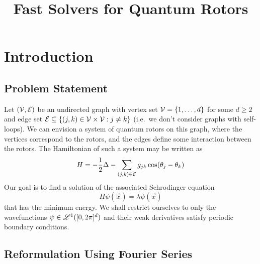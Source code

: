 \documentclass{amsart}
\title{Fast Solvers for Quantum Rotors}
\begin{document}
\maketitle

\section{Introduction}

\subsection{Problem Statement}

Let $(\mathcal{V}, \mathcal{E})$ be an undirected graph with vertex set $\mathcal{V} = \{1, \ldots,
d\}$ for some $d \geq 2$ and edge set $\mathcal{E} \subseteq \{(j, k) \in \mathcal{V} \times
\mathcal{V} : j \neq k\}$ (i.e.\ we don't consider graphs with self-loops). We can
envision a system of quantum rotors on this graph, where the vertices
correspond to the rotors, and the edges define some interaction between the
rotors. The Hamiltonian of such a system may be written as
\begin{equation}
  H = - \frac{1}{2} \Delta - \sum_{(j, k) \in \mathcal{E}} g_{jk} \cos(\theta_j -
  \theta_k)
\end{equation}
Our goal is to find a solution of the associated Schrodinger equation
\begin{equation}
  \label{eq:schrodinger}
  H \psi(\Vec{x}) = \lambda \psi(\Vec{x})
\end{equation}
that has the minimum energy. We shall restrict ourselves to only the
wavefunctions $\psi \in \mathscr{L}^1([0, 2\pi]^d)$ and their weak derivatives satisfy
periodic boundary conditions.

\subsection{Reformulation Using Fourier Series}
\end{document}
